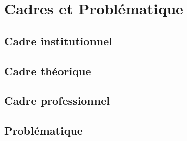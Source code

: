 \chapter{Cadres et Problématique}
\label{ch:cadre}
\section{Cadre institutionnel}
\label{sec:cadre_inst}
\lipsum
\section{Cadre théorique}
\label{sec:cadre_theo}
\lipsum
\section{Cadre professionnel}
\label{sec:cadre_pro}
\lipsum
\section{Problématique}
\label{sec:Problematique}
\lipsum
